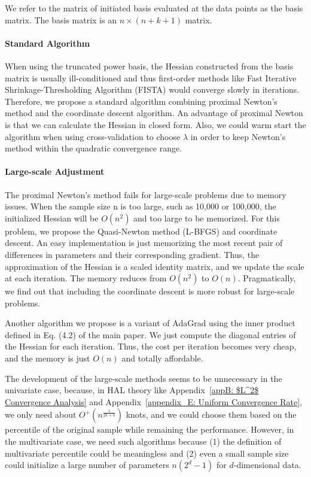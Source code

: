 We refer to the matrix of initiated basis evaluated at the data points as the basis matrix. The basis matrix is an $n \times (n+k+1)$ matrix. 
\paragraph{Standard Algorithm} When using the truncated power basis, the Hessian constructed from the basis matrix is usually ill-conditioned and thus first-order methods like Fast Iterative Shrinkage-Thresholding Algorithm (FISTA) would converge slowly in iterations. Therefore, we propose a standard algorithm combining proximal Newton's method and the coordinate descent algorithm. An advantage of proximal Newton is that we can calculate the Hessian in closed form. Also, we could warm start the algorithm when using cross-validation to choose $\lambda$ in order to keep Newton's method within the quadratic convergence range. 

\paragraph{Large-scale Adjustment} The proximal Newton's method fails for large-scale problems due to memory issues. When the sample size n is too large, such as 10,000 or 100,000, the initialized Hessian will be $O(n^2)$ and too large to be memorized. For this problem, we propose the Quasi-Newton method (L-BFGS) and coordinate descent. An easy implementation is just memorizing the most recent pair of differences in parameters and their corresponding gradient. Thus, the approximation of the Hessian is a scaled identity matrix, and we update the scale at each iteration. The memory reduces from $O(n^2)$ to $O(n)$. Pragmatically, we find out that including the coordinate descent is more robust for large-scale problems.

Another algorithm we propose is a variant of AdaGrad using the inner product defined in Eq. (4.2) of the main paper. We just compute the diagonal entries of the Hessian for each iteration. Thus, the cost per iteration becomes very cheap, and the memory is just $O(n)$ and totally affordable. 

\begin{remark}
The development of the large-scale methods seems to be unnecessary in the univariate case, because, in HAL theory like Appendix~\ref{appB: $L^2$ Convergence Analysis} and Appendix~\ref{appendix_E: Uniform Convergence Rate}, we only need about $O^+(n^{\frac{1}{2k+3}})$ knots, and we could choose them based on the percentile of the original sample while remaining the performance. However, in the multivariate case, we need such algorithms because (1) the definition of multivariate percentile could be meaningless and (2) even a small sample size could initialize a large number of parameters $n(2^d - 1)$ for $ d$-dimensional data.
\end{remark}

